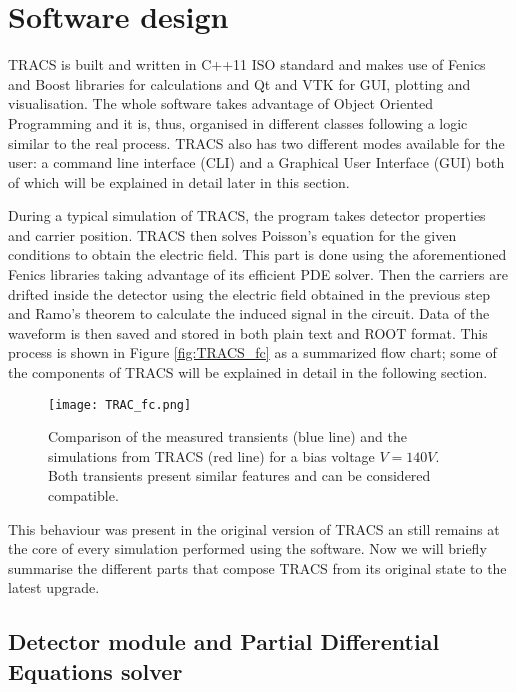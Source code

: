 \section{Software design} %
\label{sec:softDesign}

TRACS is built and written in C++11 ISO standard \cite{C++11} and makes use of Fenics \cite{Fenics} and Boost libraries \cite{Boost} for calculations and Qt \cite{Qt} and VTK \cite{VTK} for GUI, plotting and visualisation. The whole software takes advantage of Object Oriented Programming and it is, thus, organised in different classes following a logic similar to the real process. TRACS also has two different modes available for the user: a command line interface (CLI) and a Graphical User Interface (GUI) both of which will be explained in detail later in this section.

During a typical simulation of TRACS, the program takes detector properties and carrier position. TRACS then solves Poisson's equation for the given conditions to obtain the electric field. This part is done using the aforementioned Fenics libraries taking advantage of its efficient PDE solver. Then the carriers are drifted inside the detector using the electric field obtained in the previous step and Ramo's theorem to calculate the induced signal in the circuit. Data of the waveform is then saved and stored in both plain text and ROOT format. This process is shown in Figure \ref{fig:TRACS_fc} as a summarized flow chart; some of the components of TRACS will be explained in detail in the following section.

\begin{figure}[H]
	\centering
	\texttt{[image: TRAC\_fc.png]}
	\caption{Comparison of the measured transients (blue line) and the simulations from TRACS (red line) for a bias voltage $V = 140V$. Both transients present similar features and can be considered compatible.}
	\label{fig:140v}
\end{figure}

This behaviour was present in the original version of TRACS an still remains at the core of every simulation performed using the software. Now we will briefly summarise the different parts that compose TRACS from its original state to the latest upgrade.

\subsection{Detector module and Partial Differential Equations solver}

